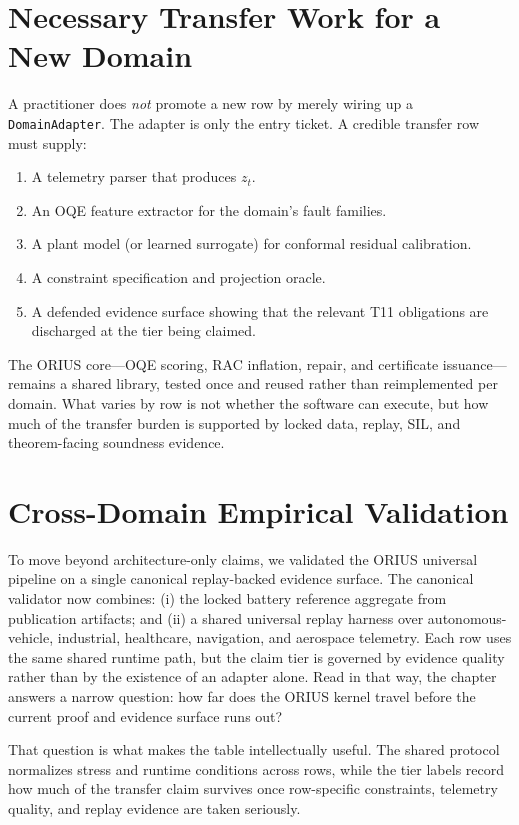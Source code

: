 \section{Necessary Transfer Work for a New Domain}

A practitioner does \emph{not} promote a new row by merely wiring up a
\texttt{DomainAdapter}.  The adapter is only the entry ticket.  A credible
transfer row must supply:

\begin{enumerate}
  \item A telemetry parser that produces $z_t$.
  \item An OQE feature extractor for the domain's fault families.
  \item A plant model (or learned surrogate) for conformal residual
	    calibration.
  \item A constraint specification and projection oracle.
  \item A defended evidence surface showing that the relevant T11 obligations
    are discharged at the tier being claimed.
\end{enumerate}

The ORIUS core---OQE scoring, RAC inflation, repair, and certificate
issuance---remains a shared library, tested once and reused rather than
reimplemented per domain.  What varies by row is not whether the software can
execute, but how much of the transfer burden is supported by locked data,
replay, SIL, and theorem-facing soundness evidence.

\section{Cross-Domain Empirical Validation}
\label{sec:cross-domain-eval}

To move beyond architecture-only claims, we validated the ORIUS universal
pipeline on a single canonical replay-backed evidence surface.  The
canonical validator now combines: (i) the locked battery reference
aggregate from publication artifacts; and (ii) a shared universal replay
harness over autonomous-vehicle, industrial, healthcare, navigation, and
aerospace telemetry.  Each row uses the same shared runtime path, but the
claim tier is governed by evidence quality rather than by the existence of
an adapter alone.  Read in that way, the chapter answers a narrow question:
how far does the ORIUS kernel travel before the current proof and evidence
surface runs out?

That question is what makes the table intellectually useful.  The shared
protocol normalizes stress and runtime conditions across rows, while the tier
labels record how much of the transfer claim survives once row-specific
constraints, telemetry quality, and replay evidence are taken seriously.

